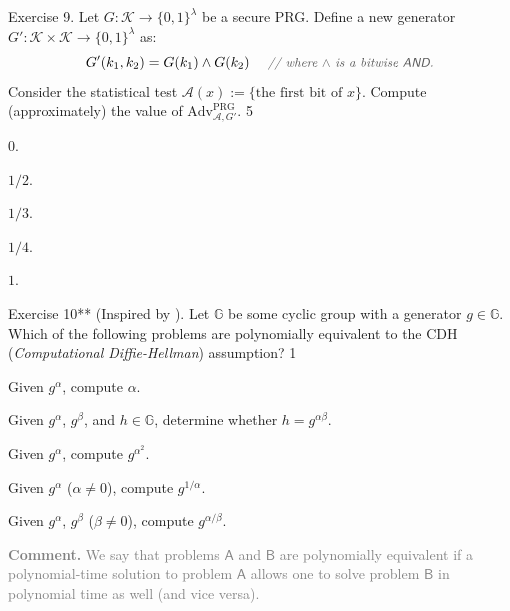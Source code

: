 \documentclass[../../book.tex]{subfiles}
\begin{document}
\begin{xexercise}
    {Exercise 9.}
    {Let $G: \mathcal{K} \to \{0,1\}^{\lambda}$ be a secure PRG. Define a new generator $G': \mathcal{K} \times \mathcal{K} \to \{0,1\}^{\lambda}$ as: 
    \begin{equation*}
        G'(k_1,k_2) = G(k_1) \wedge G(k_2) \quad \commentgray{where $\wedge$ is a bitwise \textsf{AND}.}
    \end{equation*}
    Consider the statistical test $\mathcal{A}(x) := \{\text{the first bit of } x\}$. Compute (approximately) the value of $\text{Adv}^{\text{PRG}}_{\mathcal{A},G'}$.}
    {5}
    {
        \item $0$.
        \item $1/2$.
        \item $1/3$.
        \item $1/4$.
        \item $1$.
    }
\end{xexercise}

\begin{xexercise}
    {Exercise 10** (Inspired by \cite[Exercise 10.17]{Dan_Boneh_2023}).}
    {Let $\mathbb{G}$ be some cyclic group with a generator $g \in \mathbb{G}$. Which of the following problems are polynomially equivalent to the CDH (\textit{Computational Diffie-Hellman}) assumption?}
    {1}
    {
        \item Given $g^{\alpha}$, compute $\alpha$.
        \item Given $g^{\alpha}$, $g^{\beta}$, and $h \in \mathbb{G}$, determine whether $h = g^{\alpha\beta}$.
        \item Given $g^{\alpha}$, compute $g^{\alpha^2}$.
        \item Given $g^{\alpha}$ ($\alpha \neq 0$), compute $g^{1/\alpha}$.
        \item Given $g^{\alpha}$, $g^{\beta}$ ($\beta \neq 0$), compute $g^{\alpha/\beta}$.
    }
\end{xexercise}
\textcolor{gray}{\textbf{Comment.} We say that problems $\mathsf{A}$ and $\mathsf{B}$ are polynomially equivalent if a polynomial-time solution to problem $\mathsf{A}$ allows one to solve problem $\mathsf{B}$ in polynomial time as well (and vice versa).}
\end{document}
